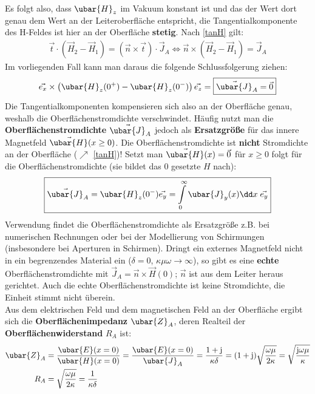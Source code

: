 Es folgt also, dass $\ubar{H}_z$ im Vakuum konstant ist und das der Wert dort genau dem Wert an der Leiteroberfläche entspricht, die Tangentialkomponente des H-Feldes ist hier an der Oberfläche \textbf{stetig}. Nach \ref{tanH} gilt:
		        \begin{equation}\begin{split}
				        \vec{t}\cdot (\vec{H} _2 - \vec{H} _1) = (\vec{n} \times \vec{t})\cdot \vec{J}_A \Leftrightarrow \vec{n}\times (\vec{H} _2 - \vec{H} _1) = \vec{J}_A 
			        \end{split}\end{equation}
		   Im vorliegenden Fall kann man daraus die folgende Schlussfolgerung ziehen: 
		   \begin{equation}
		   	\vec{e_x} \times \left(\ubar{H}_z(0^+) - \ubar{H}_z(0^-)  \right) \vec{e_z} = \boxed{\vec{\ubar{J}}_A = \vec{0}}
		   \end{equation}
		   Die Tangentialkomponenten kompensieren sich also an der Oberfläche genau, weshalb die Oberflächenstromdichte verschwindet. Häufig nutzt man die \textbf{Oberflächenstromdichte} $\vec{\ubar{J}}_A$ jedoch als \textbf{Ersatzgröße} für das innere Magnetfeld $\vec{\ubar{H}}(x\ge 0)$. Die Oberflächenstromdichte ist \textbf{nicht} Stromdichte an der Oberfläche ($\nearrow$ \ref{tanH})! Setzt man $\vec{\ubar{H}}(x) = \vec{0}$ für $x\ge 0$ folgt für die Oberflächenstromdichte (sie bildet das 0 gesetzte $H$ nach):
		        \begin{equation}\begin{split}
				        \boxed{\vec{\ubar{J}}_A =\ubar{H}_z(0^-) \vec{e_y} = \int\limits_0^\infty \ubar{J}_y(x) \dd x \; \vec{e_y}}
			        \end{split}\end{equation}
		   Verwendung findet die Oberflächenstromdichte als Ersatzgröße z.B. bei numerischen Rechnungen oder bei der Modellierung von Schirmungen (insbesondere bei Aperturen in Schirmen). Dringt ein externes Magnetfeld nicht in ein begrenzendes Material ein ($\delta=0$, $\kappa\mu\omega \to \infty$), so gibt es eine \textbf{echte} Oberflächenstromdichte mit $\vec{J}_A = \vec{n} \times \vec{H} (0)$; $\vec{n}$ ist aus dem Leiter heraus gerichtet. Auch die echte Oberflächenstromdichte ist keine Stromdichte, die Einheit stimmt nicht überein.\\
		   Aus dem elektrischen Feld und dem magnetischen Feld an der Oberfläche ergibt sich die \textbf{Oberflächenimpedanz} $\ubar{Z}_A$, deren Realteil der \textbf{Oberflächenwiderstand} $R_A$ ist:
		        \begin{equation}\begin{split}
				        \ubar{Z}_A &= \frac{ \ubar{E}(x=0)}{\ubar{H}(x=0)} = \frac{ \ubar{E}(x=0)}{ \ubar{J}_A } = \frac{1+\mathrm{j}}{\kappa\delta} = (1+\mathrm{j}) \sqrt{\frac{\omega\mu}{2\kappa}} = \sqrt{\frac{\mathrm{j}\omega \mu}{\kappa}}\\
				        R_A &= \sqrt{\frac{\omega\mu}{2\kappa}} = \frac{1}{\kappa\delta}
			        \end{split}\end{equation}
